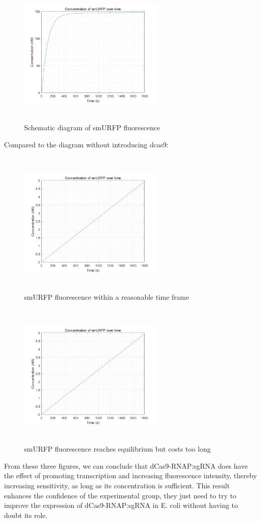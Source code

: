 \begin{figure}[!htbp]
	\centering
	\includegraphics[width=7cm,height=7cm]{23}
	\caption{Schematic diagram of smURFP fluorescence}
\end{figure}
Compared to the diagram without introducing dcas9:
\begin{figure}[!htbp]
	\centering
	\includegraphics[width=7cm,height=7cm]{21}
	\caption{smURFP fluorescence within a reasonable time frame}
\end{figure}
\begin{figure}[!htbp]
	\centering
	\includegraphics[width=7cm,height=7cm]{21}
	\caption{smURFP fluorescence reaches equilibrium but costs too long}
\end{figure}
From these three figures, we can conclude that dCas9-RNAP:sgRNA does have the effect of promoting transcription and increasing fluorescence intensity, thereby increasing sensitivity, as long as its concentration is sufficient. This result enhances the confidence of the experimental group, they just need to try to improve the expression of dCas9-RNAP:sgRNA in E. coli without having to doubt its role.



